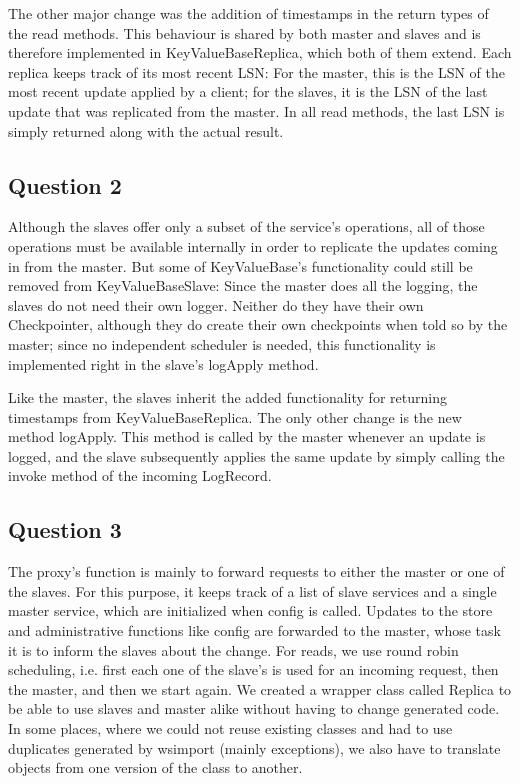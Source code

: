 \documentclass[12pt,a4paper,fleqn]{article}
\begin{document}
The other major change was the addition of timestamps in the return types of the read methods. This behaviour is shared by both master and slaves and is therefore implemented in KeyValueBaseReplica, which both of them extend. Each replica keeps track of its most recent LSN: For the master, this is the LSN of the most recent update applied by a client; for the slaves, it is the LSN of the last update that was replicated from the master. In all read methods, the last LSN is simply returned along with the actual result.

\subsection*{Question 2}
\label{sec:pq2}
Although the slaves offer only a subset of the service's operations, all of those operations must be available internally in order to replicate the updates coming in from the master. But some of KeyValueBase's functionality could still be removed from KeyValueBaseSlave: Since the master does all the logging, the slaves do not need their own logger. Neither do they have their own Checkpointer, although they do create their own checkpoints when told so by the master; since no independent scheduler is needed, this functionality is implemented right in the slave's logApply method.

Like the master, the slaves inherit the added functionality for returning timestamps from KeyValueBaseReplica. The only other change  is the new method logApply. This method is called by the master whenever an update is logged, and the slave subsequently applies the same update by simply calling the invoke method of the incoming LogRecord. 

\subsection*{Question 3}
\label{sec:pq3}
The proxy's function is mainly to forward requests to either the master or one of the slaves. For this purpose, it keeps track of a list of slave services and a single master service, which are initialized when config is called. Updates to the store and administrative functions like config are forwarded to the master, whose task it is to inform the slaves about the change. For reads, we use round robin scheduling, i.e. first each one of the slave's is used for an incoming request, then the master, and then we start again. We created a wrapper class called Replica to be able to use slaves and master alike without having to change generated code. In some places, where we could not reuse existing classes and had to use duplicates generated by wsimport (mainly exceptions), we also have to translate objects from one version of the class to another. 
\end{document}
